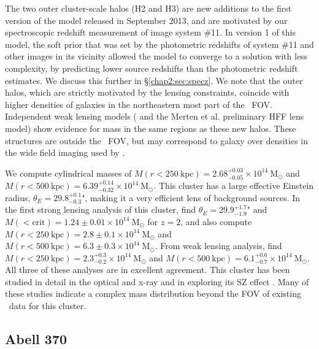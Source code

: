 The two outer cluster-scale halos (H2 and H3) are new additions to the first version of the model released in September 2013, and are motivated by our spectroscopic redshift measurement of image system \#11. In version 1 of this model, the soft prior that was set by the photometric redshifts of system \#11 and other images in its vicinity allowed the model to converge to a solution with less complexity, by predicting lower source redshifts than the photometric redshift estimates.  We discuss this further in \S \ref{chap2:sec:specz}.  We note that the outer halos, which are strictly motivated by the lensing constraints, coincide with higher densities of galaxies in the northeastern most part of the \hst\ FOV. Independent weak lensing models (\citet{Gruen:2013lr} and the Merten et al. preliminary HFF lens model) show evidence for mass in the same regions as these new halos. These structures are outside the \hst\ FOV, but may correspond to galaxy over densities in the wide field imaging used by \citet[][Figure~15 of that publication]{Gruen:2013lr}.

We compute cylindrical masses of $M(r<250\ \mathrm{kpc})=2.68^{+0.03}_{-0.05}\times10^{14}\ \mathrm{M_\odot}$ and $M(r<500\ \mathrm{kpc})=6.39^{+0.14}_{-0.32}\times10^{14}\ \mathrm{M_\odot}$. This cluster has a large effective Einstein radius, $\theta_E=29.8^{+0.1}_{-0.3}$", making it a very efficient lens of background sources. In the first strong lensing analysis of this cluster, \citet{Monna:2014lr} find $\theta_E=29.9^{+1.7}_{-1.9}$" and $M(<\mathrm{crit})=1.24\pm0.01\times10^{14}\ \mathrm{M_\odot}$ for $z=2$, and also compute $M(r<250\ \mathrm{kpc})=2.8\pm0.1\times10^{14}\ \mathrm{M_\odot}$ and $M(r<500\ \mathrm{kpc})=6.3\pm0.3\times10^{14}\ \mathrm{M_\odot}$. From weak lensing analysis, \citet{Gruen:2013lr} find $M(r<250\ \mathrm{kpc})=2.3^{+0.3}_{-0.2}\times10^{14}\ \mathrm{M_\odot}$ and $M(r<500\ \mathrm{kpc})=6.1^{+0.6}_{-0.7}\times10^{14}\ \mathrm{M_\odot}$. All three of these analyses are in excellent agreement. This cluster has been studied in detail in the optical and x-ray \citep{Cruddace:2002vn,Maughan:2008rt,Comis:2011fr,Gomez:2012yq} and in exploring its SZ effect \citep{Plagge:2010ys}. Many of these studies indicate a complex mass distribution beyond the FOV of existing \hst\ data for this cluster.

\subsection{Abell 370}

